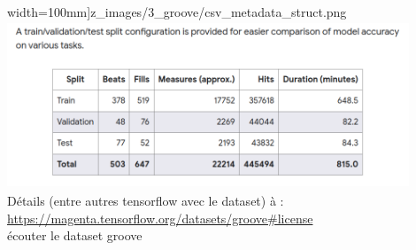 width=100mm]{z_images/3_groove/csv_metadata_struct.png}\\
\includegraphics[height=50mm, width=120mm]{z_images/3_groove/train_validation_test.png}\\
Détails (entre autres tensorflow avec le dataset) à :
\url{https://magenta.tensorflow.org/datasets/groove#license}\\
écouter le dataset groove
\newpage
